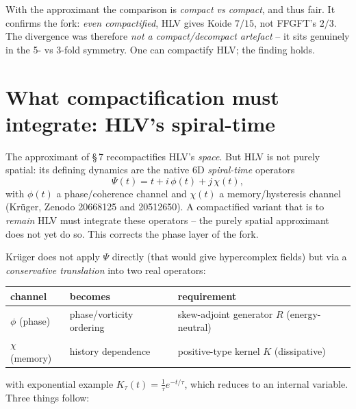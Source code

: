 \begin{keyresult}
With the approximant the comparison is \emph{compact vs compact}, and thus fair. It
confirms the fork: \emph{even compactified}, HLV gives Koide $7/15$, not FFGFT's
$2/3$. The divergence was therefore \emph{not a compact/decompact artefact} -- it
sits genuinely in the 5- vs 3-fold symmetry. One can compactify HLV; the finding
holds.
\end{keyresult}

\section{What compactification must integrate: HLV's spiral-time}

The approximant of §\,7 recompactifies HLV's \emph{space}. But HLV is not purely
spatial: its defining dynamics are the native 6D \emph{spiral-time} operators
\begin{equation}
\Psi(t)=t+i\,\phi(t)+j\,\chi(t),
\end{equation}
with $\phi(t)$ a phase/coherence channel and $\chi(t)$ a memory/hysteresis channel
(Krüger, Zenodo 20668125 and 20512650). A compactified variant that is to
\emph{remain} HLV must integrate these operators -- the purely spatial approximant
does not yet do so. This corrects the phase layer of the fork.

Krüger does not apply $\Psi$ directly (that would give hypercomplex fields) but via
a \emph{conservative translation} into two real operators:
\begin{center}
\begin{tabular}{lll}
\toprule
channel & becomes & requirement \\
\midrule
$\phi$ (phase) & phase/vorticity ordering & skew-adjoint generator $R$ (energy-neutral) \\
$\chi$ (memory) & history dependence & positive-type kernel $K$ (dissipative) \\
\bottomrule
\end{tabular}
\end{center}
with exponential example $K_\tau(t)=\tfrac1\tau e^{-t/\tau}$, which reduces to an
internal variable. Three things follow:

